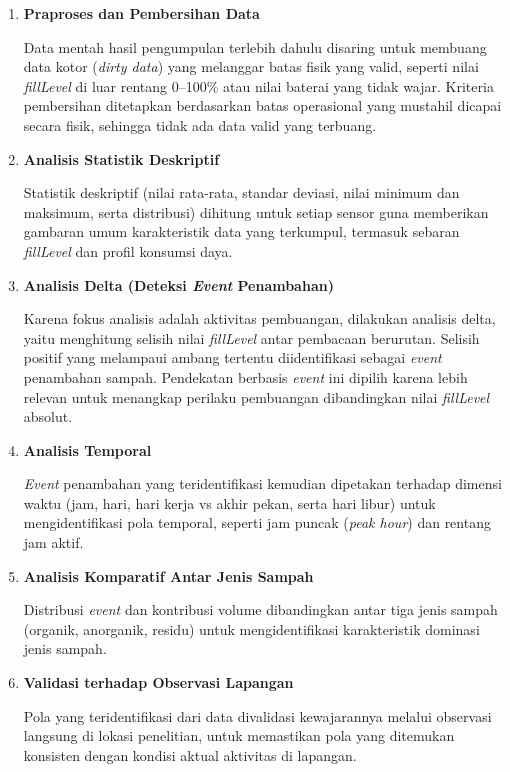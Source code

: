 \begin{enumerate}
    \item \textbf{Praproses dan Pembersihan Data}

    Data mentah hasil pengumpulan terlebih dahulu disaring untuk membuang data kotor (\textit{dirty data}) yang melanggar batas fisik yang valid, seperti nilai \textit{fillLevel} di luar rentang 0--100\% atau nilai baterai yang tidak wajar. Kriteria pembersihan ditetapkan berdasarkan batas operasional yang mustahil dicapai secara fisik, sehingga tidak ada data valid yang terbuang.

    \item \textbf{Analisis Statistik Deskriptif}

    Statistik deskriptif (nilai rata-rata, standar deviasi, nilai minimum dan maksimum, serta distribusi) dihitung untuk setiap sensor guna memberikan gambaran umum karakteristik data yang terkumpul, termasuk sebaran \textit{fillLevel} dan profil konsumsi daya.

    \item \textbf{Analisis Delta (Deteksi \textit{Event} Penambahan)}

    Karena fokus analisis adalah aktivitas pembuangan, dilakukan analisis delta, yaitu menghitung selisih nilai \textit{fillLevel} antar pembacaan berurutan. Selisih positif yang melampaui ambang tertentu diidentifikasi sebagai \textit{event} penambahan sampah. Pendekatan berbasis \textit{event} ini dipilih karena lebih relevan untuk menangkap perilaku pembuangan dibandingkan nilai \textit{fillLevel} absolut.

    \item \textbf{Analisis Temporal}

    \textit{Event} penambahan yang teridentifikasi kemudian dipetakan terhadap dimensi waktu (jam, hari, hari kerja vs akhir pekan, serta hari libur) untuk mengidentifikasi pola temporal, seperti jam puncak (\textit{peak hour}) dan rentang jam aktif.

    \item \textbf{Analisis Komparatif Antar Jenis Sampah}

    Distribusi \textit{event} dan kontribusi volume dibandingkan antar tiga jenis sampah (organik, anorganik, residu) untuk mengidentifikasi karakteristik dominasi jenis sampah.

    \item \textbf{Validasi terhadap Observasi Lapangan}

    Pola yang teridentifikasi dari data divalidasi kewajarannya melalui observasi langsung di lokasi penelitian, untuk memastikan pola yang ditemukan konsisten dengan kondisi aktual aktivitas di lapangan.
\end{enumerate}


